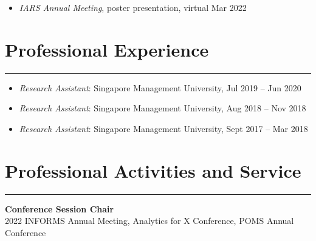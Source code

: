 \documentclass[12pt, a4paper]{article}
\begin{document}
{\begin{itemize}[leftmargin=36pt, itemsep=8pt, parsep=0.2pt, topsep=1pt]
\begin{itemize}[leftmargin=20pt, itemsep=2pt, topsep=2pt]
		\item {\it IARS Annual Meeting}, poster presentation, virtual \hfill Mar 2022
	
	\end{itemize}

\end{itemize}




\section*{Professional Experience}
\vspace*{0.4em}
\hrule height 0.5pt
\begin{itemize}[leftmargin=36pt, itemsep=0pt, parsep=0.2pt, topsep=1pt]

	\item {\it Research Assistant}: Singapore Management University, Jul 2019 -- Jun 2020

	\item {\it Research Assistant}: Singapore Management University, Aug 2018 -- Nov 2018

  \item {\it Research Assistant}: Singapore Management University, Sept 2017 -- Mar 2018

\end{itemize}




\section*{Professional Activities and Service}
\vspace*{0.4em}
\hrule height 0.5pt

\raggedright\textbf{Conference Session Chair}\\
2022 \hspace*{10mm} INFORMS Annual Meeting, Analytics for X Conference, POMS Annual Conference 
	

}
\end{document}
